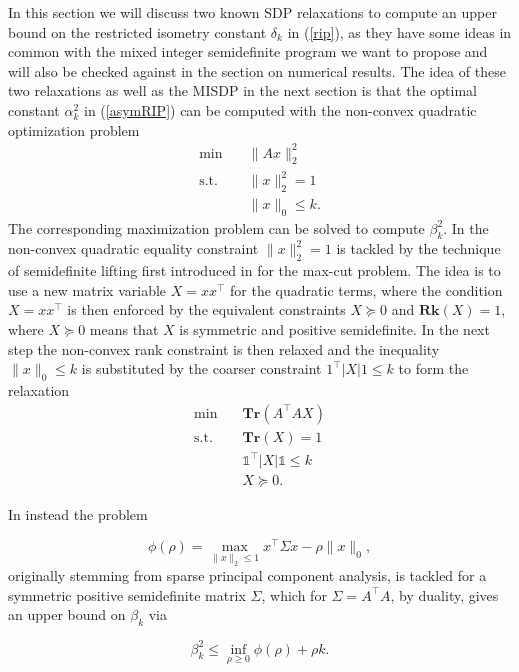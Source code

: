 \documentclass[a4paper,11pt,1p]{elsarticle}
\newcommand{\T}{^{\top}}
\newcommand{\Tr}{\textbf{Tr}}
\newcommand{\Rk}{\textbf{Rk}}
\newcommand{\ones}{\mathds{1}}
\begin{document}
In this section we will discuss two known SDP relaxations to compute an upper bound on the restricted isometry constant $\delta_k$ in (\ref{rip}), as they have some ideas in common with the mixed integer semidefinite program we want to 
propose and will also be checked against in the section on numerical results. The idea of these two relaxations as well as the MISDP in the next section is that the optimal constant $\alpha_k^2$ in (\ref{asymRIP}) can be computed
with the non-convex quadratic optimization problem
\begin{align}\label{QP}
 \text{min} \quad & \|Ax\|_2^2 \nonumber \\
 \text{s.t.} \quad & \|x\|_2^2 = 1 \tag{QP} \\
 & \|x\|_0 \leq k. \nonumber
\end{align}
The corresponding maximization problem can be solved to compute $\beta_k^2$. In \cite{Asp07} the non-convex quadratic equality constraint $\|x\|_2^2 = 1$ is tackled by the technique of semidefinite lifting first introduced in \cite{GW95} 
for the max-cut problem. The idea is to use a new matrix variable $X=xx\T$ for the quadratic terms, where the condition $X=xx\T$ is then enforced by the equivalent constraints $X \succeq 0$ and $\Rk(X) = 1$, where 
$X \succeq 0$ means that $X$ is symmetric and positive semidefinite. In the next step the non-convex rank constraint is then relaxed and the inequality $\|x\|_0 \leq k$ is substituted by the coarser constraint $1\T|X|1 \leq k$ to form
the relaxation
\begin{align}\label{Asp07}
 \text{min} \quad & \Tr(A\T A X) \nonumber \\
 \text{s.t.} \quad & \Tr(X) = 1 \nonumber \\
 & \ones\T|X|\ones \leq k \tag{A1} \\
 & X \succeq 0. \nonumber
\end{align}

In \cite{Asp08} instead the problem

\begin{equation}\label{phi}
 \phi(\rho) = \max_{\|x\|_2 \leq 1} x\T \Sigma x - \rho \|x\|_0,
\end{equation}
originally stemming from sparse principal component analysis, is tackled for a symmetric positive semidefinite matrix $\Sigma$, which for
$\Sigma = A\T A$, by duality, gives an upper bound on $\beta_k$ via 

\begin{equation*}
 \beta_k^2 \leq \inf_{\rho \geq 0} \phi(\rho) + \rho k.
\end{equation*}
\end{document}
